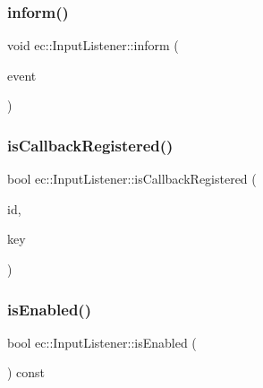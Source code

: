 \mbox{\label{classec_1_1_input_listener_a39e0803651e945e177336df2cf84d61b}} 
\subsubsection{\texorpdfstring{inform()}{inform()}}
{\footnotesize\ttfamily void ec\+::\+Input\+Listener\+::inform (\begin{DoxyParamCaption}\item[{const \mbox{\hyperlink{structec_1_1_input_event}{Input\+Event}} \&}]{event }\end{DoxyParamCaption})}

\mbox{\label{classec_1_1_input_listener_a7904bb2c23ef7dc00e341b8b3c9d1afb}} 
\subsubsection{\texorpdfstring{is\+Callback\+Registered()}{isCallbackRegistered()}}
{\footnotesize\ttfamily bool ec\+::\+Input\+Listener\+::is\+Callback\+Registered (\begin{DoxyParamCaption}\item[{const std\+::string \&}]{id,  }\item[{\mbox{\hyperlink{classec_1_1_input_listener_af5dfb691564fa8e05fcf7f053e3c532b}{Event\+Key\+\_\+\+Type}}}]{key }\end{DoxyParamCaption})}

\mbox{\label{classec_1_1_input_listener_a6d7a4e04543e3a86745261d9fefcbfc1}} 
\subsubsection{\texorpdfstring{is\+Enabled()}{isEnabled()}}
{\footnotesize\ttfamily bool ec\+::\+Input\+Listener\+::is\+Enabled (\begin{DoxyParamCaption}{ }\end{DoxyParamCaption}) const\hspace{0.3cm}{\ttfamily [virtual]}}

